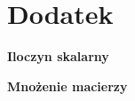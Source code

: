 \documentclass[../mn-notatki.tex]{subfiles}
\begin{document}
\section{Dodatek}

\begin{tcolorbox}
\textbf{Iloczyn skalarny}
\end{tcolorbox}


\begin{tcolorbox}
\textbf{Mnożenie macierzy}
\end{tcolorbox}


\pagebreak
\end{document}
